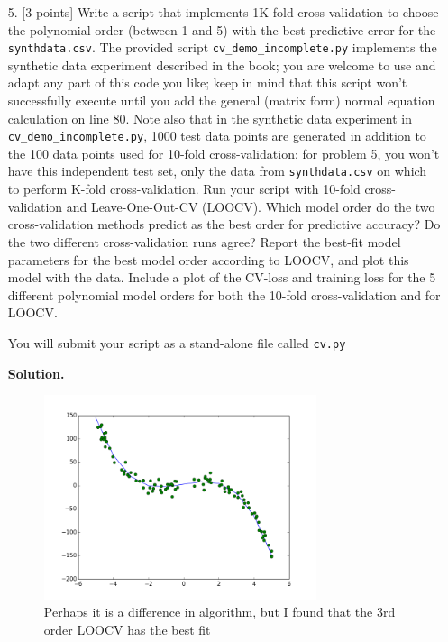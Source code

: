 \documentclass[10pt]{article}
\begin{document}
\begin{itemize}
\item[5.] [3 points]
Write a script that implements 1K-fold cross-validation to choose the polynomial order (between 1 and 5) with the best predictive error for the {\tt synthdata.csv}.  The provided script {\tt cv\_demo\_incomplete.py} implements the synthetic data experiment described in the book; you are welcome to use and adapt any part of this code you like; keep in mind that this script won't successfully execute until you add the general (matrix form) normal equation calculation on line 80.
Note also that in the synthetic data experiment in {\tt cv\_demo\_incomplete.py}, 1000 test data points are generated in addition to the 100 data points used for 10-fold cross-validation; for problem 5, you won't have this independent test set, only the data from {\tt synthdata.csv} on which to perform K-fold cross-validation.
Run your script with 10-fold cross-validation and Leave-One-Out-CV (LOOCV).
Which model order do the two cross-validation methods predict as the best order for predictive accuracy?
Do the two different cross-validation runs agree?
Report the best-fit model parameters for the best model order according to LOOCV, and plot this model with the data.
Include a plot of the CV-loss and training loss for the 5 different polynomial model orders for both the 10-fold cross-validation and for LOOCV.

You will submit your script as a stand-alone file called {\tt cv.py}

{\bf Solution.} 


\begin{figure}[htb]
\begin{center}
\includegraphics[width=8cm]{LOOCV_3order.png}
\caption{Perhaps it is a difference in algorithm, but I found that the 3rd order LOOCV has the best fit
\label{fig:synth4th}}
\end{center}
\end{figure}


\end{itemize}
\end{document}
